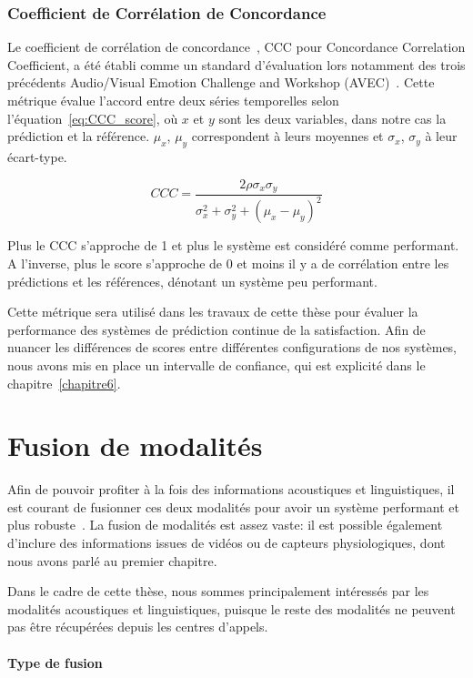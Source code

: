 \subsubsection{Coefficient de Corrélation de Concordance}
Le coefficient de corrélation de concordance~\cite{CCC}, CCC pour Concordance Correlation Coefficient, a été établi comme un standard d'évaluation lors notamment des trois précédents Audio/Visual Emotion Challenge and Workshop (AVEC)~\cite{AVEC2017,AVEC2018,AVEC2019}. Cette métrique évalue l'accord entre deux séries temporelles selon l'équation~\ref{eq:CCC_score}, où $x$ et $y$ sont les deux variables, dans notre cas la prédiction et la référence. $\mu_x$, $\mu_y$ correspondent à leurs moyennes et $\sigma_x$, $\sigma_y$ à leur écart-type.

 \begin{equation}
    CCC = \frac{2\rho\sigma_x\sigma_y}{\sigma_x^2 + \sigma_y^2 + (\mu_x - \mu_y)^2}
 \label{eq:CCC_score}
 \end{equation}

Plus le CCC s'approche de 1 et plus le système est considéré comme performant. A l'inverse, plus le score s'approche de 0 et moins il y a de corrélation entre les prédictions et les références, dénotant un système peu performant.

Cette métrique sera utilisé dans les travaux de cette thèse pour évaluer la performance des systèmes de prédiction continue de la satisfaction. Afin de nuancer les différences de scores entre différentes configurations de nos systèmes, nous avons mis en place un intervalle de confiance, qui est explicité dans le chapitre~\ref{chapitre6}.

\section{Fusion de modalités}
Afin de pouvoir profiter à la fois des informations acoustiques et linguistiques, il est courant de fusionner ces deux modalités pour avoir un système performant et plus robuste~\cite{Wollmer2013,Alam2014,Atrey2010,Liu2018}. La fusion de modalités est assez vaste: il est possible également d'inclure des informations issues de vidéos ou de capteurs physiologiques, dont nous avons parlé au premier chapitre.

Dans le cadre de cette thèse, nous sommes principalement intéressés par les modalités acoustiques et linguistiques, puisque le reste des modalités ne peuvent pas être récupérées depuis les centres d'appels.
\\
\\
\textbf{Type de fusion}

